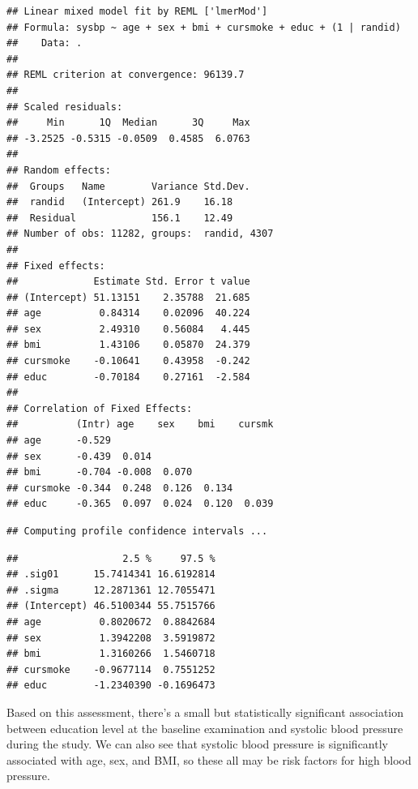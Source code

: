 \documentclass[
]{book}
\newenvironment{Shaded}{\begin{snugshade}}{\end{snugshade}}
\newcommand{\KeywordTok}[1]{\textcolor[rgb]{0.13,0.29,0.53}{\textbf{#1}}}
\newcommand{\NormalTok}[1]{#1}
\newcommand{\OperatorTok}[1]{\textcolor[rgb]{0.81,0.36,0.00}{\textbf{#1}}}
\newcommand{\StringTok}[1]{\textcolor[rgb]{0.31,0.60,0.02}{#1}}
\begin{document}
\begin{verbatim}
## Linear mixed model fit by REML ['lmerMod']
## Formula: sysbp ~ age + sex + bmi + cursmoke + educ + (1 | randid)
##    Data: .
## 
## REML criterion at convergence: 96139.7
## 
## Scaled residuals: 
##     Min      1Q  Median      3Q     Max 
## -3.2525 -0.5315 -0.0509  0.4585  6.0763 
## 
## Random effects:
##  Groups   Name        Variance Std.Dev.
##  randid   (Intercept) 261.9    16.18   
##  Residual             156.1    12.49   
## Number of obs: 11282, groups:  randid, 4307
## 
## Fixed effects:
##             Estimate Std. Error t value
## (Intercept) 51.13151    2.35788  21.685
## age          0.84314    0.02096  40.224
## sex          2.49310    0.56084   4.445
## bmi          1.43106    0.05870  24.379
## cursmoke    -0.10641    0.43958  -0.242
## educ        -0.70184    0.27161  -2.584
## 
## Correlation of Fixed Effects:
##          (Intr) age    sex    bmi    cursmk
## age      -0.529                            
## sex      -0.439  0.014                     
## bmi      -0.704 -0.008  0.070              
## cursmoke -0.344  0.248  0.126  0.134       
## educ     -0.365  0.097  0.024  0.120  0.039
\end{verbatim}

\begin{Shaded}
\end{Shaded}

\begin{verbatim}
## Computing profile confidence intervals ...
\end{verbatim}

\begin{verbatim}
##                  2.5 %     97.5 %
## .sig01      15.7414341 16.6192814
## .sigma      12.2871361 12.7055471
## (Intercept) 46.5100344 55.7515766
## age          0.8020672  0.8842684
## sex          1.3942208  3.5919872
## bmi          1.3160266  1.5460718
## cursmoke    -0.9677114  0.7551252
## educ        -1.2340390 -0.1696473
\end{verbatim}

Based on this assessment, there's a small but statistically significant
association between education level at the baseline examination and
systolic blood pressure during the study. We can also see that systolic
blood pressure is significantly associated with age, sex, and BMI, so
these all may be risk factors for high blood pressure.
\end{document}
